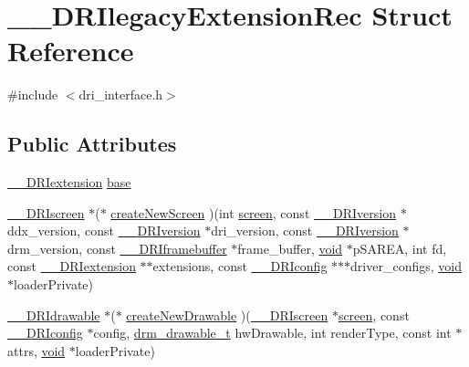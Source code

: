 \hypertarget{struct_____d_r_ilegacy_extension_rec}{}\section{\+\_\+\+\_\+\+D\+R\+Ilegacy\+Extension\+Rec Struct Reference}
\label{struct_____d_r_ilegacy_extension_rec}


{\ttfamily \#include $<$dri\+\_\+interface.\+h$>$}

\subsection*{Public Attributes}
\begin{DoxyCompactItemize}
\item 
\hyperlink{dri__interface_8h_a4e0a61c8ece00d2b2c6792a9a1b55385}{\+\_\+\+\_\+\+D\+R\+Iextension} \hyperlink{struct_____d_r_ilegacy_extension_rec_a03e6696cc6f5377d4a4ae731f25cfd2d}{base}
\item 
\hyperlink{dri__interface_8h_a9961b01d421ee1fd6ed3c05acc9ca561}{\+\_\+\+\_\+\+D\+R\+Iscreen} $\ast$($\ast$ \hyperlink{struct_____d_r_ilegacy_extension_rec_a0f24c65e8962f0f97f8da36f1062806d}{create\+New\+Screen} )(int \hyperlink{cad_8h_ae04e09e4e3831bfc1632c509ae37dcec}{screen}, const \hyperlink{dri__interface_8h_a824c6134dbdbbf2f62c2c6a44fcbdf02}{\+\_\+\+\_\+\+D\+R\+Iversion} $\ast$ddx\+\_\+version, const \hyperlink{dri__interface_8h_a824c6134dbdbbf2f62c2c6a44fcbdf02}{\+\_\+\+\_\+\+D\+R\+Iversion} $\ast$dri\+\_\+version, const \hyperlink{dri__interface_8h_a824c6134dbdbbf2f62c2c6a44fcbdf02}{\+\_\+\+\_\+\+D\+R\+Iversion} $\ast$drm\+\_\+version, const \hyperlink{dri__interface_8h_a8cb888e603d44eef2287cacd07fc5e2c}{\+\_\+\+\_\+\+D\+R\+Iframebuffer} $\ast$frame\+\_\+buffer, \hyperlink{_s_d_l__opengles2__gl2ext_8h_ae5d8fa23ad07c48bb609509eae494c95}{void} $\ast$p\+S\+A\+R\+EA, int fd, const \hyperlink{dri__interface_8h_a4e0a61c8ece00d2b2c6792a9a1b55385}{\+\_\+\+\_\+\+D\+R\+Iextension} $\ast$$\ast$extensions, const \hyperlink{dri__interface_8h_aeac81999efbbf8b1d6886338e3ea24d9}{\+\_\+\+\_\+\+D\+R\+Iconfig} $\ast$$\ast$$\ast$driver\+\_\+configs, \hyperlink{_s_d_l__opengles2__gl2ext_8h_ae5d8fa23ad07c48bb609509eae494c95}{void} $\ast$loader\+Private)
\item 
\hyperlink{dri__interface_8h_a5bfb832a0a08208d95b3bbef439d2262}{\+\_\+\+\_\+\+D\+R\+Idrawable} $\ast$($\ast$ \hyperlink{struct_____d_r_ilegacy_extension_rec_a9ce548e89f41dff7bb99a6469b288b66}{create\+New\+Drawable} )(\hyperlink{dri__interface_8h_a9961b01d421ee1fd6ed3c05acc9ca561}{\+\_\+\+\_\+\+D\+R\+Iscreen} $\ast$\hyperlink{cad_8h_ae04e09e4e3831bfc1632c509ae37dcec}{screen}, const \hyperlink{dri__interface_8h_aeac81999efbbf8b1d6886338e3ea24d9}{\+\_\+\+\_\+\+D\+R\+Iconfig} $\ast$config, \hyperlink{dri__interface_8h_a4c60ae3cfe339592fb3e5129f427e241}{drm\+\_\+drawable\+\_\+t} hw\+Drawable, int render\+Type, const int $\ast$attrs, \hyperlink{_s_d_l__opengles2__gl2ext_8h_ae5d8fa23ad07c48bb609509eae494c95}{void} $\ast$loader\+Private)
$$
\end{DoxyCompactItemize}
